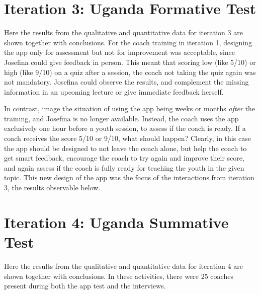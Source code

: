 \section{Iteration 3: Uganda Formative Test}

Here the results from the qualitative and quantitative data for iteration 3 are shown together with conclusions. For the coach training in iteration 1, designing the app only for assessment but not for improvement was acceptable, since Josefina could give feedback in person. This meant that scoring low (like 5/10) or high (like 9/10) on a quiz after a session, the coach not taking the quiz again was not mandatory. Josefina could observe the results, and complement the missing information in an upcoming lecture or give immediate feedback herself.

In contrast, image the situation of using the app being weeks or months \textit{after} the training, and Josefina is no longer available. Instead, the coach uses the app exclusively one hour before a youth session, to assess if the coach is ready. If a coach receives the score 5/10 or 9/10, what should happen? Clearly, in this case the app should be designed to not leave the coach alone, but help the coach to get smart feedback, encourage the coach to try again and improve their score, and again assess if the coach is fully ready for teaching the youth in the given topic. This new design of the app was the focus of the interactions from iteration 3, the results observable below.






\section{Iteration 4: Uganda Summative Test}

Here the results from the qualitative and quantitative data for iteration 4 are shown together with conclusions. In these activities, there were 25 coaches present during both the app test and the interviews.




%


